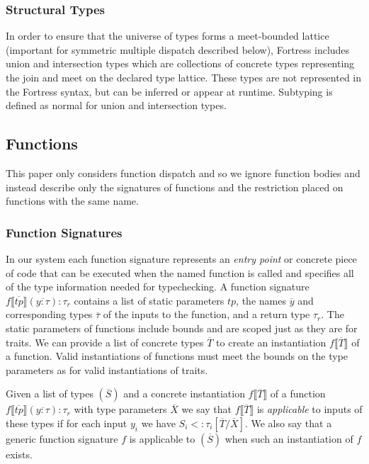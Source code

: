 \documentclass[preprint]{sigplanconf}
\newcommand{\obb}[1]{\ensuremath{\llbracket \overline{#1} \rrbracket}}
\begin{document}
\subsubsection{Structural Types}

In order to ensure that the universe of types forms a meet-bounded lattice (important for symmetric
multiple dispatch described below), Fortress includes union and intersection types which are collections
of concrete types representing the join and meet on the declared type lattice.  These
types are not represented in the Fortress syntax, but can be inferred or appear at runtime.  Subtyping
is defined as normal for union and intersection types.

\subsection{Functions}

This paper only considers function dispatch and so we ignore function bodies and instead describe only the
signatures of functions and the restriction placed on functions with the same name.

\subsubsection{Function Signatures}

In our system each function signature represents an {\it entry point} or concrete piece of code that can be executed 
when the named function is called and specifies all of the type information needed for typechecking.  A function signature 
$f\obb{tp}(\overline{y : \tau}) : \tau_r$ contains a list of static parameters $tp$, the names $\overline{y}$ and corresponding
types $\overline{\tau}$ of the inputs to the function, and a return type $\tau_r$.  The static parameters of functions include bounds and 
are scoped just as they are for traits.  We can provide a list of concrete types $\overline{T}$ to create an instantiation $f\obb{T}$ of a function.  
Valid instantiations of functions must meet the bounds on the type parameters as for valid instantiations of traits.

Given a list of types $(\overline{S})$ and a concrete instantiation $f\obb{T}$ of a function $f\obb{tp}(\overline{y : \tau}) : \tau_r$ 
with type parameters $\overline{X}$ we say that $f\obb{T}$ is {\it applicable} to inputs of these types if for each input $y_i$ we have 
$S_i <: \tau_i[\overline{T}/\overline{X}]$.  We also say that a generic function signature $f$ is applicable to $(\overline{S})$ 
when such an instantiation of $f$ exists.
\end{document}
